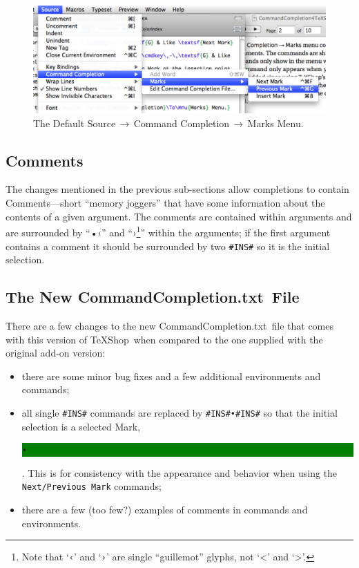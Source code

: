 \documentclass[11pt]{article}
\newcommand{\mnu}[1]{\textsf{#1}}
\newcommand{\To}{\,\(\to\)\,}
\newcommand{\selmark}{\colorbox{green}{\rule[-0.5ex]{0ex}{2.1ex}\texttt{•}}}
\newcommand{\TS}{\textsf{\TeX Shop}}
\newcommand{\CCT}{\textsf{CommandCompletion.txt}}
\begin{document}
\begin{figure}
\centering\includegraphics[width=5.5in]{figs/DefaultMarksMenu}
\caption{The Default \mnu{Source}\To\mnu{Command Completion}\To\mnu{Marks} Menu.}
\label{fig:marks}
\end{figure}

\subsection*{Comments}

The changes mentioned in the previous sub-sections allow completions to contain Comments---short ``memory joggers'' that have some information about the contents of a given argument. The comments are contained within arguments and are surrounded by ``•‹'' and ``›\footnote{Note that `\texttt{‹}' and `\texttt{›}' are single ``guillemot'' glyphs, not `<' and `>'.}'' within the arguments; if the first argument contains a comment it should be surrounded by two \verb|#INS#| so it is the initial selection.

\subsection*{The New \CCT\ File}

There are a few changes to the new \CCT\ file that comes with this version of \TS\ when compared to the one supplied with the original add-on version:
\begin{itemize}
\item
there are some minor bug fixes and a few additional environments and commands;
\item
all single \verb|#INS#| commands are replaced by \verb|#INS#•#INS#| so that the initial selection is a selected Mark, \selmark. This is for consistency with the appearance and behavior when using the \texttt{Next/Previous Mark} commands;
\item
there are a few (too few?) examples of comments in commands and environments.
\end{itemize}
\end{document}
